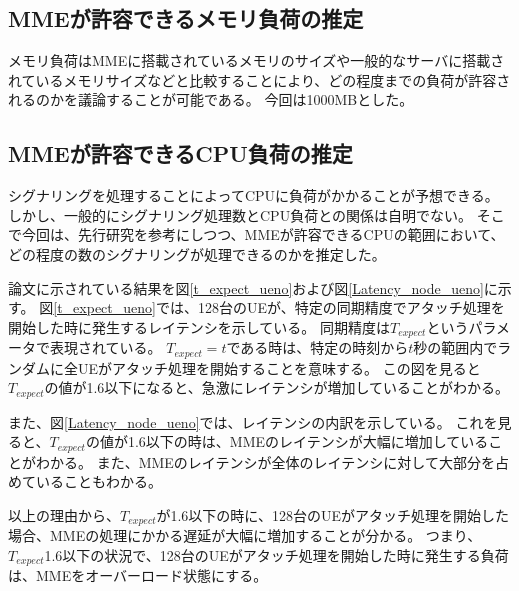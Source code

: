 \documentclass[a4j]{ujarticle}
\begin{document}
\subsection{MMEが許容できるメモリ負荷の推定}
メモリ負荷はMMEに搭載されているメモリのサイズや一般的なサーバに搭載されているメモリサイズなどと比較することにより、どの程度までの負荷が許容されるのかを議論することが可能である。
今回は1000MBとした。

\subsection{MMEが許容できるCPU負荷の推定}
シグナリングを処理することによってCPUに負荷がかかることが予想できる。
しかし、一般的にシグナリング処理数とCPU負荷との関係は自明でない。
そこで今回は、先行研究を参考にしつつ、MMEが許容できるCPUの範囲において、どの程度の数のシグナリングが処理できるのかを推定した。

論文\cite{多数のM2M/IoT端末からの集中アクセスを考慮したモバイルコアネットワークの実験評価}に示されている結果を図\ref{t_expect_ueno}および図\ref{Latency_node_ueno}に示す。
図\ref{t_expect_ueno}では、128台のUEが、特定の同期精度でアタッチ処理を開始した時に発生するレイテンシを示している。
同期精度は$T_{expect}$というパラメータで表現されている。
$T_{expect} = t$である時は、特定の時刻から$t$秒の範囲内でランダムに全UEがアタッチ処理を開始することを意味する。
この図を見ると$T_{expect}$の値が1.6以下になると、急激にレイテンシが増加していることがわかる。

また、図\ref{Latency_node_ueno}では、レイテンシの内訳を示している。
これを見ると、$T_{expect}$の値が1.6以下の時は、MMEのレイテンシが大幅に増加していることがわかる。
また、MMEのレイテンシが全体のレイテンシに対して大部分を占めていることもわかる。

以上の理由から、$T_{expect}$が1.6以下の時に、128台のUEがアタッチ処理を開始した場合、MMEの処理にかかる遅延が大幅に増加することが分かる。
つまり、$T_{expect}$1.6以下の状況で、128台のUEがアタッチ処理を開始した時に発生する負荷は、MMEをオーバーロード状態にする。
\end{document}

